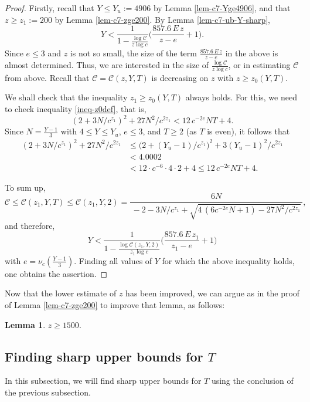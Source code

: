 \documentclass[11pt]{amsart}
\newtheorem{lem}{Lemma}[section]
\numberwithin{equation}{section}
\begin{document}
\begin{proof}
Firstly, recall that $Y \le Y_u:=4906$ by Lemma \ref{lem-c7-Yge4906}, and that $z \ge z_1:=200$ by Lemma \ref{lem-c7-zge200}.
By Lemma \ref{lem-c7-ub-Y-sharp}, 
\[
Y<\dfrac{1}{1 - \frac{\log \mathcal C}{z\log c}} \biggl( \dfrac{857.6\,E\,z}{z-e}+1\bigg).
\]
Since $e \le 3$ and $z$ is not so small, the size of the term $\frac{857.6\,E\,z}{z-e}$ in the above is almost determined.
Thus, we are interested in the size of $\frac{\log \mathcal C}{z\log c}$, or in estimating $\mathcal C$ from above.
Recall that $\mathcal C=\mathcal C(z,Y,T)$ is decreasing on $z$ with $z \ge z_0(Y,T)$. 

We shall check that the inequality $z_1 \ge z_0(Y,T)$ always holds.
For this, we need to check inequality \eqref{ineq-z0def}, that is,
\[
(2+3N/c^{z_1})^2+27N^2/c^{2z_1}<12\,c^{-2e}N T+4.
\]
Since $N=\frac{Y-1}{3}$ with $4 \le Y \le Y_u$, $e \le 3$, and $T \ge 2$ (as $T$ is even), it follows that
\begin{align*}
(2+3N/c^{z_1})^2+27N^2/c^{2z_1}
&\le \big(2+(Y_u-1)/c^{z_1}\bigr)^2+3(Y_u-1)^2/c^{2z_1}\\
&<4.0002\\
&<12 \cdot c^{-6} \cdot 4 \cdot 2+4 \le 12\,c^{-2e}N T+4.
\end{align*}

To sum up, 
\[
\mathcal C \le \mathcal C(z_1,Y,T) \le \mathcal C(z_1,Y,2)= \frac{6N}{\,-2-3N/c^{z_1}+\sqrt{4\,(6c^{-2e}N +1)-27{N}^2/c^{2z_1}}\,},
\]
and therefore,
\[
Y<\dfrac{1}{1 - \frac{\log \mathcal C(z_1,Y,2)}{z_1\log c}} \biggl( \dfrac{857.6\,E\,z_1}{z_1-e}+1\bigg)
\]
with $e=\nu_{c}(\frac{Y-1}{3})$.
Finding all values of $Y$ for which the above inequality holds, one obtains the assertion.
\end{proof}

Now that the lower estimate of $z$ has been improved, we can argue as in the proof of Lemma \ref{lem-c7-zge200} to improve that lemma, as follows:

\begin{lem}\label{lem-c7-zge1500}
$z \ge 1500.$
\end{lem}

\subsection{Finding sharp upper bounds for $T$}
\label{sec-7.3}
%
In this subsection, we will find sharp upper bounds for $T$ using the conclusion of the previous subsection.
\end{document}
